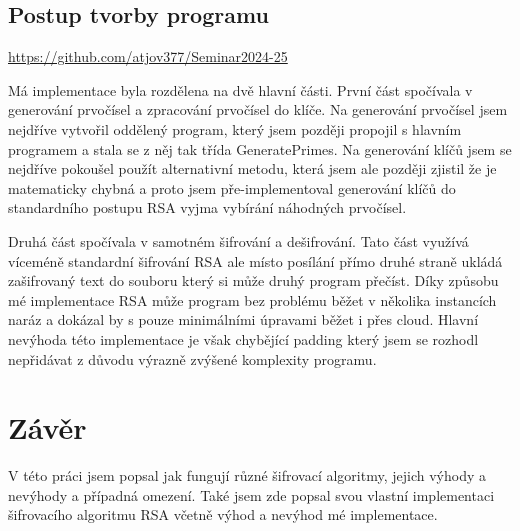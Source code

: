 \documentclass[12pt,a4paper]{report}
\begin{document}
\section{Postup tvorby programu}

\url{https://github.com/atjov377/Seminar2024-25}

Má implementace byla rozdělena na dvě hlavní části. První část spočívala v generování prvočísel a zpracování prvočísel do klíče. Na generování prvočísel jsem nejdříve vytvořil oddělený program, který jsem později propojil s hlavním programem a stala se z něj tak třída GeneratePrimes. Na generování klíčů jsem se nejdříve pokoušel použít alternativní metodu, která jsem ale později zjistil že je matematicky chybná a proto jsem pře-implementoval generování klíčů do standardního postupu RSA vyjma vybírání náhodných prvočísel. 

Druhá část spočívala v samotném šifrování a dešifrování. Tato část využívá víceméně standardní šifrování RSA ale místo posílání přímo druhé straně ukládá zašifrovaný text do souboru který si může druhý program přečíst. Díky způsobu mé implementace RSA může program bez problému běžet v několika instancích naráz a dokázal by s pouze minimálními úpravami běžet i přes cloud. Hlavní nevýhoda této implementace je však chybějící padding který jsem se rozhodl nepřidávat z důvodu výrazně zvýšené komplexity programu. 



\chapter{Závěr}
V této práci jsem popsal jak fungují různé šifrovací algoritmy, jejich výhody a nevýhody a případná omezení. Také jsem zde popsal svou vlastní implementaci šifrovacího algoritmu RSA včetně výhod a nevýhod mé implementace.
\end{document}
